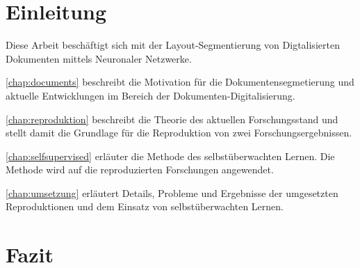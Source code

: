 

\section*{Einleitung}
Diese Arbeit beschäftigt sich mit der Layout-Segmentierung von Digtalisierten Dokumenten mittels Neuronaler Netzwerke.

\cref{chap:documents} beschreibt die Motivation für die Dokumentensegmetierung und aktuelle Entwicklungen im
Bereich der Dokumenten-Digitalisierung.

\cref{chap:reproduktion} beschreibt die Theorie des aktuellen Forschungsstand und stellt damit die Grundlage für die Reproduktion von zwei Forschungsergebnissen.

\cref{chap:selfsupervised} erläuter die Methode des selbstüberwachten Lernen. Die Methode wird auf die reproduzierten Forschungen angewendet.

\cref{chap:umsetzung} erläutert Details, Probleme und Ergebnisse der umgesetzten
Reproduktionen und dem Einsatz von selbstüberwachten Lernen.






\section{Fazit}


